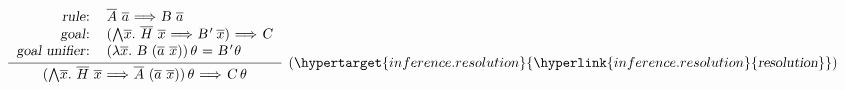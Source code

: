 \begin{isabellebody}
\begin{isamarkuptext}
  \[
  \infer[(\indexdef{}{inference}{resolution}\hypertarget{inference.resolution}{\hyperlink{inference.resolution}{\mbox{\isa{resolution}}}})]
  {\isa{{\isaliteral{22}{\isachardoublequote}}{\isaliteral{28}{\isacharparenleft}}{\isaliteral{5C3C416E643E}{\isasymAnd}}\isaliteral{5C3C5E7665633E}{}\isactrlvec x{\isaliteral{2E}{\isachardot}}\ \isaliteral{5C3C5E7665633E}{}\isactrlvec H\ \isaliteral{5C3C5E7665633E}{}\isactrlvec x\ {\isaliteral{5C3C4C6F6E6772696768746172726F773E}{\isasymLongrightarrow}}\ \isaliteral{5C3C5E7665633E}{}\isactrlvec A\ {\isaliteral{28}{\isacharparenleft}}\isaliteral{5C3C5E7665633E}{}\isactrlvec a\ \isaliteral{5C3C5E7665633E}{}\isactrlvec x{\isaliteral{29}{\isacharparenright}}{\isaliteral{29}{\isacharparenright}}{\isaliteral{5C3C76617274686574613E}{\isasymvartheta}}\ {\isaliteral{5C3C4C6F6E6772696768746172726F773E}{\isasymLongrightarrow}}\ C{\isaliteral{5C3C76617274686574613E}{\isasymvartheta}}{\isaliteral{22}{\isachardoublequote}}}}
  {\begin{tabular}{rl}
    \isa{{\isaliteral{22}{\isachardoublequote}}rule{\isaliteral{3A}{\isacharcolon}}{\isaliteral{22}{\isachardoublequote}}} &
    \isa{{\isaliteral{22}{\isachardoublequote}}\isaliteral{5C3C5E7665633E}{}\isactrlvec A\ \isaliteral{5C3C5E7665633E}{}\isactrlvec a\ {\isaliteral{5C3C4C6F6E6772696768746172726F773E}{\isasymLongrightarrow}}\ B\ \isaliteral{5C3C5E7665633E}{}\isactrlvec a{\isaliteral{22}{\isachardoublequote}}} \\
    \isa{{\isaliteral{22}{\isachardoublequote}}goal{\isaliteral{3A}{\isacharcolon}}{\isaliteral{22}{\isachardoublequote}}} &
    \isa{{\isaliteral{22}{\isachardoublequote}}{\isaliteral{28}{\isacharparenleft}}{\isaliteral{5C3C416E643E}{\isasymAnd}}\isaliteral{5C3C5E7665633E}{}\isactrlvec x{\isaliteral{2E}{\isachardot}}\ \isaliteral{5C3C5E7665633E}{}\isactrlvec H\ \isaliteral{5C3C5E7665633E}{}\isactrlvec x\ {\isaliteral{5C3C4C6F6E6772696768746172726F773E}{\isasymLongrightarrow}}\ B{\isaliteral{27}{\isacharprime}}\ \isaliteral{5C3C5E7665633E}{}\isactrlvec x{\isaliteral{29}{\isacharparenright}}\ {\isaliteral{5C3C4C6F6E6772696768746172726F773E}{\isasymLongrightarrow}}\ C{\isaliteral{22}{\isachardoublequote}}} \\
    \isa{{\isaliteral{22}{\isachardoublequote}}goal\ unifier{\isaliteral{3A}{\isacharcolon}}{\isaliteral{22}{\isachardoublequote}}} &
    \isa{{\isaliteral{22}{\isachardoublequote}}{\isaliteral{28}{\isacharparenleft}}{\isaliteral{5C3C6C616D6264613E}{\isasymlambda}}\isaliteral{5C3C5E7665633E}{}\isactrlvec x{\isaliteral{2E}{\isachardot}}\ B\ {\isaliteral{28}{\isacharparenleft}}\isaliteral{5C3C5E7665633E}{}\isactrlvec a\ \isaliteral{5C3C5E7665633E}{}\isactrlvec x{\isaliteral{29}{\isacharparenright}}{\isaliteral{29}{\isacharparenright}}{\isaliteral{5C3C76617274686574613E}{\isasymvartheta}}\ {\isaliteral{3D}{\isacharequal}}\ B{\isaliteral{27}{\isacharprime}}{\isaliteral{5C3C76617274686574613E}{\isasymvartheta}}{\isaliteral{22}{\isachardoublequote}}} \\
   \end{tabular}}
  \]


\end{isamarkuptext}
\end{isabellebody}
